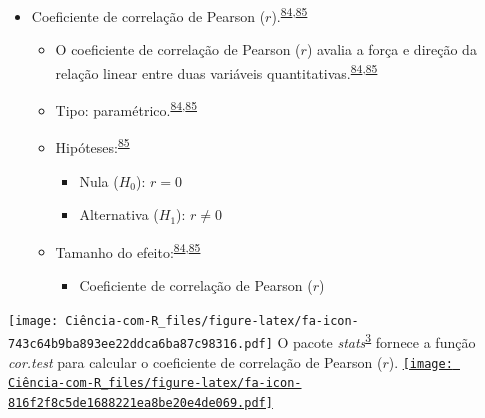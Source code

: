 \documentclass[
]{book}
\providecommand{\tightlist}{%
  \setlength{\itemsep}{0pt}\setlength{\parskip}{0pt}}
\begin{document}
\begin{itemize}
\item
  Coeficiente de correlação de Pearson (\(r\)).\textsuperscript{\protect\hyperlink{ref-khamis2008}{84},\protect\hyperlink{ref-allison2022}{85}}

  \begin{itemize}
  \item
    O coeficiente de correlação de Pearson (\(r\)) avalia a força e direção da relação linear entre duas variáveis quantitativas.\textsuperscript{\protect\hyperlink{ref-khamis2008}{84},\protect\hyperlink{ref-allison2022}{85}}
  \item
    Tipo: paramétrico.\textsuperscript{\protect\hyperlink{ref-khamis2008}{84},\protect\hyperlink{ref-allison2022}{85}}
  \item
    Hipóteses:\textsuperscript{\protect\hyperlink{ref-allison2022}{85}}

    \begin{itemize}
    \item
      Nula (\(H_{0}\)): \(r=0\)
    \item
      Alternativa (\(H_{1}\)): \(r≠0\)
    \end{itemize}
  \item
    Tamanho do efeito:\textsuperscript{\protect\hyperlink{ref-khamis2008}{84},\protect\hyperlink{ref-allison2022}{85}}

    \begin{itemize}
    \tightlist
    \item
      Coeficiente de correlação de Pearson (\(r\))
    \end{itemize}
  \end{itemize}
\end{itemize}

\texttt{[image: Ciência-com-R\_files/figure-latex/fa-icon-743c64b9ba893ee22ddca6ba87c98316.pdf]} O pacote \emph{stats}\textsuperscript{\protect\hyperlink{ref-stats-2}{3}} fornece a função \emph{cor.test} para calcular o coeficiente de correlação de Pearson (\(r\)). \href{https://rdocumentation.org/packages/stats/versions/3.6.2}{\texttt{[image: Ciência-com-R\_files/figure-latex/fa-icon-816f2f8c5de1688221ea8be20e4de069.pdf]}}
\end{document}
